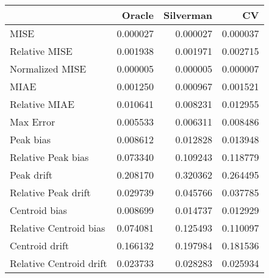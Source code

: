 \begin{tabular}{lrrr}
  \hline
 & Oracle & Silverman & CV \\ 
  \hline
MISE & 0.000027 & 0.000027 & 0.000037 \\ 
  Relative MISE & 0.001938 & 0.001971 & 0.002715 \\ 
  Normalized MISE & 0.000005 & 0.000005 & 0.000007 \\ 
  MIAE & 0.001250 & 0.000967 & 0.001521 \\ 
  Relative MIAE & 0.010641 & 0.008231 & 0.012955 \\ 
  Max Error & 0.005533 & 0.006311 & 0.008486 \\ 
  Peak bias & 0.008612 & 0.012828 & 0.013948 \\ 
  Relative Peak bias & 0.073340 & 0.109243 & 0.118779 \\ 
  Peak drift & 0.208170 & 0.320362 & 0.264495 \\ 
  Relative Peak drift & 0.029739 & 0.045766 & 0.037785 \\ 
  Centroid bias & 0.008699 & 0.014737 & 0.012929 \\ 
  Relative Centroid bias & 0.074081 & 0.125493 & 0.110097 \\ 
  Centroid drift & 0.166132 & 0.197984 & 0.181536 \\ 
  Relative Centroid drift & 0.023733 & 0.028283 & 0.025934 \\ 
   \hline
\end{tabular}
